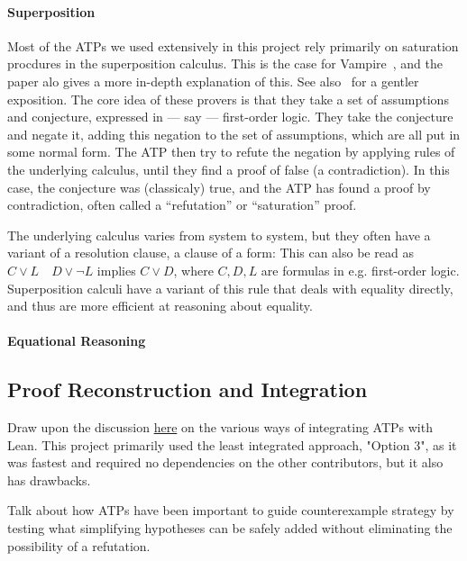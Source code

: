 \paragraph{Superposition}
Most of the ATPs we used extensively in this project rely primarily on saturation procdures in the superposition calculus.
This is the case for Vampire~\cite{DBLP:conf/cav/KovacsV13}, and the paper alo gives a more in-depth explanation of this.
See also~\cite{DBLP:journals/cacm/BentkampBNTVW23} for a gentler exposition.
The core idea of these provers is that they take a set of assumptions and conjecture, expressed in --- say --- first-order logic.
They take the conjecture and negate it, adding this negation to the set of assumptions, which are all put in some normal form.
The ATP then try to refute the negation by applying rules of the underlying calculus, until they find a proof of false (a contradiction).
In this case, the conjecture was (classicaly) true, and the ATP has found a proof by contradiction, often called a ``refutation'' or ``saturation'' proof.

The underlying calculus varies from system to system, but they often have a variant of a resolution clause, a clause of a form:
This can also be read as $C \lor L \quad D \lor \neg L$ implies $C \lor D$, where $C, D, L$ are formulas in e.g. first-order logic.
Superposition calculi have a variant of this rule that deals with equality directly, and thus are more efficient at reasoning about equality.

\paragraph{Equational Reasoning}


\subsection{Proof Reconstruction and Integration}
\label{sec:proof-reconstruction}

Draw upon the discussion \href{https://leanprover.zulipchat.com/#narrow/stream/458659-Equational/topic/Future.20of.20Using.20ATPs}{here} on the various ways of integrating ATPs with Lean. This project primarily used the least integrated approach, "Option 3", as it was fastest and required no dependencies on the other contributors, but it also has drawbacks.

Talk about how ATPs have been important to guide counterexample strategy by testing what simplifying hypotheses can be safely added without eliminating the possibility of a refutation.

